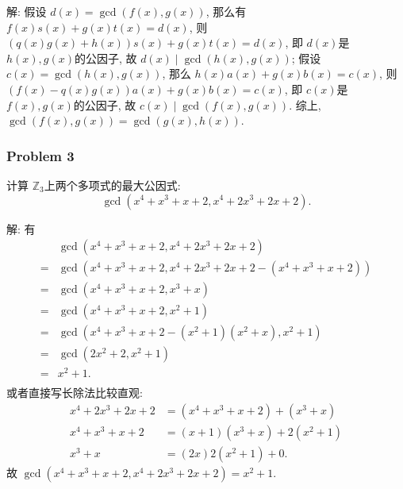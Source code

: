 \documentclass[a4paper,12pt]{ctexart}
\newcommand{\Z}{\mathbb{Z}}
\begin{document}
    解: 假设 $ d(x)=\gcd(f(x),g(x)) $, 那么有 $ f(x)s(x)+g(x)t(x)=d(x) $, 则 $ \left( q(x)g(x)+h(x) \right)s(x)+g(x)t(x)=d(x) $, 即
    $ d(x) $是 $ h(x),g(x) $的公因子, 故 $ d(x)\mid\gcd(h(x),g(x)) $;
    假设 $ c(x)=\gcd(h(x),g(x)) $, 那么 $ h(x)a(x)+g(x)b(x)=c(x) $, 则 $ \left( f(x)-q(x)g(x) \right)a(x)+g(x)b(x)=c(x) $, 即
    $ c(x) $是 $ f(x),g(x) $的公因子, 故 $ c(x)\mid\gcd(f(x),g(x)) $. 综上, $ \gcd(f(x),g(x))=\gcd(g(x),h(x)) $.
\subsubsection*{Problem 3} 
    计算 $ \Z_3 $上两个多项式的最大公因式:
    \[\gcd(x^4+x^3+x+2,x^4+2x^3+2x+2).\]

    解: 有 
    \begin{align*}
      &\gcd(x^4+x^3+x+2,x^4+2x^3+2x+2)\\
      =&\gcd(x^4+x^3+x+2,x^4+2x^3+2x+2-(x^4+x^3+x+2))\\
      =&\gcd(x^4+x^3+x+2,x^3+x)\\
      =&\gcd(x^4+x^3+x+2,x^2+1)\\
      =&\gcd(x^4+x^3+x+2-(x^2+1)(x^2+x),x^2+1)\\
      =&\gcd(2x^2+2,x^2+1)\\
      =&x^2+1.\\
    \end{align*}
    或者直接写长除法比较直观:
    \begin{align*}
      x^4+2x^3+2x+2&=(x^4+x^3+x+2)+(x^3+x)\\
      x^4+x^3+x+2&=(x+1)(x^3+x)+2(x^2+1)\\
      x^3+x&=(2x)2(x^2+1)+0.
    \end{align*}
    故 $ \gcd(x^4+x^3+x+2,x^4+2x^3+2x+2)=x^2+1 $.
\end{document}
